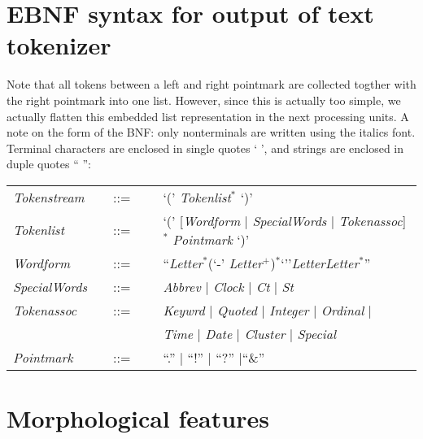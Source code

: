 \appendix
\section{EBNF syntax for output of text tokenizer}
\label{scan-bnf}
Note that all tokens between a left and right pointmark are collected
togther with the right pointmark into one list. However, since this is
actually too simple, we actually flatten this embedded list
representation in the next processing units. A note on the form of the
BNF: only nonterminals are written using the italics font. 
Terminal characters are enclosed in single
quotes ` ', and strings are enclosed in duple quotes `` '':
\vspace{1cm}

\begin{tabular}{lcl}

{\it Tokenstream}  &  ~~::=~~~   
                   & `(' {\it Tokenlist}$^\ast$ `)' \\

{\it Tokenlist}    &  ~~::=~~~   
                   & `(' [{\it Wordform} $\mid$ {\it SpecialWords}
                   $\mid$ {\it Tokenassoc}]$^\ast$ {\it Pointmark} `)'\\

{\it Wordform}     & ~~::=~~~ 
                   &``{\it Letter}$^\ast$(`-'{\it
                   Letter}$^+$)$^\ast$`''{\it Letter}{\it Letter}$^\ast$''\\ 

{\it SpecialWords} & ~~::=~~~ 
                   & {\it Abbrev} $\mid$ {\it Clock} $\mid$ {\it Ct}
                   $\mid$ {\it St} \\

{\it Tokenassoc}   & ~~::=~~~ 
                   & {\it Keywrd} $\mid$ {\it Quoted} $\mid$ {\it
                   Integer} $\mid$ {\it Ordinal} $\mid$ \\
                   &   
                   &  {\it Time} $\mid$ {\it Date} $\mid$ {\it Cluster}
                   $\mid$ {\it Special} \\ 

{\it Pointmark}    & ~~::=~~~ 
                   & ``.'' $\mid$ ``!'' $\mid$ ``?'' $\mid$``\&'' \\
\end{tabular}
\vspace{1cm}

\section{Morphological features}
\label{morph-bnf}

